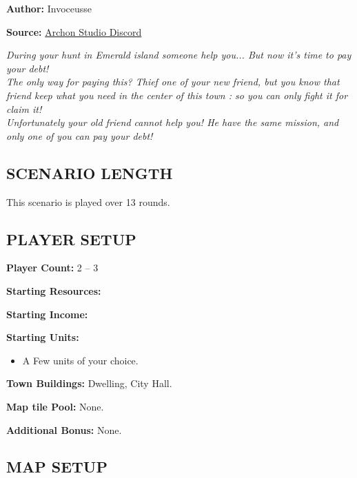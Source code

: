 
\begin{multicols*}{2}

\textbf{Author:} Invoceusse

\textbf{Source:} \href{https://discord.com/channels/740870068178649108/1230205022705418302}{Archon Studio Discord}

\textit{During your hunt in Emerald island someone help you... But now it's time to pay your debt!\\
The only way for paying this? Thief one of your new friend, but you know that friend keep what you need in the center of this town : so you can only fight it for claim it!\\
Unfortunately your old friend cannot help you! He have the same mission, and only one of you can pay your debt!
}

\subsection*{\MakeUppercase{Scenario Length}}

This scenario is played over 13 rounds.

\subsection*{\MakeUppercase{Player setup}}

\textbf{Player Count:} 2 -- 3

\textbf{Starting Resources:}\par
{}

\textbf{Starting Income:}\par
{}

\textbf{Starting Units:}
\begin{itemize}
  \item A Few  units of your choice.
\end{itemize}

\textbf{Town Buildings:}  Dwelling, City Hall.

\textbf{Map tile Pool:} None.

\textbf{Additional Bonus:} None.

\subsection*{\MakeUppercase{Map Setup}}


\end{multicols*}
